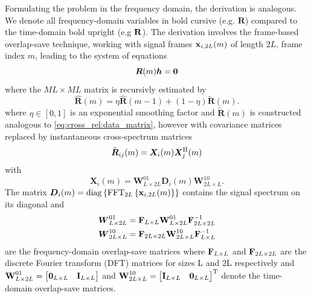 \documentclass{article}
\newcommand{\x}{\mtxb{x}}
\newcommand{\R}{\mtxb{R}}
\newcommand{\hf}{{\bm{h}}}
\newcommand{\Rf}{{\bm{{R}}}}
\begin{document}
Formulating the problem in the frequency domain, the derivation is analogous. We denote all frequency-domain variables in bold cursive (e.g. \(\Rf\)) compared to the time-domain bold upright (e.g \(\R\)). The derivation involves the frame-based overlap-save technique, working with signal frames \(\x_{i,2L}(m)\) of length \(2L\), frame index \(m\), leading to the system of equations 
\begin{equation}
    \Rf(m) \hf = \bm{0} \label{eq:frequency_domain:null_space}\\
\end{equation}
where the \(M L \times M L\) matrix is recursivly estimated by \begin{equation}
    \hat{\Rf}(m) = \eta \hat{\Rf}(m-1) + (1-\eta )\tilde{\Rf}(m).
\end{equation}
where \(\eta \in [0,1]\) is an exponential smoothing factor and \(\tilde{\Rf}(m)\) is constructed analogous to \eqref{eq:cross_rel:data_matrix}, however with covariance matrices replaced by instantaneous cross-spectrum matrices 
\begin{equation}
    \tilde{\Rf}_{ij}(m) = \bm{X}_{i} (m) \bm{X}_{j}^\herm (m)
\end{equation}
with 
\begin{equation}
    \bm{X}_{i}(m) = \bm{{W}}^{01}_{L \times 2L} \bm{{D}}_{i}(m) \bm{{W}}^{10}_{2L \times L}.
\end{equation}
The matrix \(\bm{{D}}_{i}(m) = \operatorname{diag} \left\{ \operatorname{FFT}_{2L} \left\{ \x_{i,2L}(m) \right\} \right\}\) contains the  signal spectrum on its diagonal and
\begin{align}
    \bm{{W}}_{L \times 2L}^{01} &= \bm{\mathrm{F}}_{L \times L} \bm{\mathrm{W}}_{L \times 2L}^{01} \bm{\mathrm{F}}_{2L \times 2L}^{-1}\\
    \bm{{W}}_{2L \times L}^{10} &= \bm{\mathrm{F}}_{2L \times 2L} \bm{\mathrm{W}}_{2L \times L}^{10} \bm{\mathrm{F}}_{L \times L}^{-1}
\end{align} are the frequency-domain overlap-save matrices where \(\bm{\mathrm{F}}_{L \times L}\) and \(\bm{\mathrm{F}}_{2L \times 2L}\) are the discrete Fourier transform (DFT) matrices for sizes L and 2L respectively and \(
    \bm{\mathrm{W}}_{L \times 2L}^{01} = \begin{bmatrix}
        \bm{\mathrm{0}}_{L \times L} & \bm{\mathrm{I}}_{L \times L}
    \end{bmatrix}\)
    and \(
    \bm{\mathrm{W}}_{2L \times L}^{10} = \begin{bmatrix}
        \bm{\mathrm{I}}_{L \times L} & \bm{\mathrm{0}}_{L \times L}
    \end{bmatrix}^{\mathrm{T}}\)
denote the time-domain overlap-save matrices.
\end{document}
